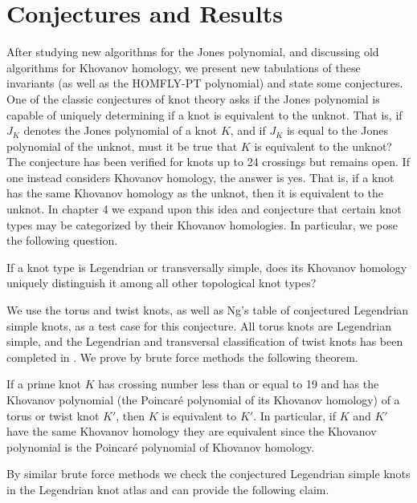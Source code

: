 \section{Conjectures and Results}
    After studying new algorithms for the Jones polynomial, and discussing
    old algorithms for Khovanov homology, we present new tabulations of these
    invariants (as well as the HOMFLY-PT polynomial) and state some conjectures.
    One of the classic conjectures of knot theory asks if the Jones polynomial
    is capable of uniquely determining if a knot is equivalent to the unknot.
    That is, if $J_{K}$ denotes the Jones polynomial of a knot $K$, and if
    $J_{K}$ is equal to the Jones polynomial of the unknot, must it be true
    that $K$ is equivalent to the unknot? The conjecture has been verified for
    knots up to 24 crossings \cite{VerificationUnknotJonesConjUpTo24} but
    remains open. If one instead considers Khovanov homology, the answer is
    yes. That is, if a knot has the same Khovanov homology as the unknot, then
    it is equivalent to the unknot. In chapter 4 we expand upon this idea and
    conjecture that certain knot types may be categorized by their Khovanov
    homologies. In particular, we pose the following question.
    \begin{question}
        If a knot type is Legendrian or transversally simple, does its Khovanov
        homology uniquely distinguish it among all other topological knot types?
    \end{question}
    We use the torus and twist knots, as well as Ng's table of conjectured
    Legendrian simple knots, as a test case for this conjecture. All
    torus knots are Legendrian simple, and the Legendrian and transversal
    classification of twist knots has been completed in
    \cite{EtnyreEtAlLegendrianAndTransverseTwistKnots}. We prove by brute
    force methods the following theorem.
    \begin{theorem}
        If a prime knot $K$ has crossing number less than or equal to 19 and
        has the Khovanov polynomial (the Poincar\'{e} polynomial
        of its Khovanov homology) of a torus or twist knot $K'$, then $K$ is
        equivalent to $K'$. In particular, if $K$ and $K'$ have the same
        Khovanov homology they are equivalent since the Khovanov polynomial is
        the Poincar\'{e} polynomial of Khovanov homology.
    \end{theorem}
    By similar brute force methods we check the conjectured Legendrian simple
    knots in the Legendrian knot atlas and can provide the following claim.
